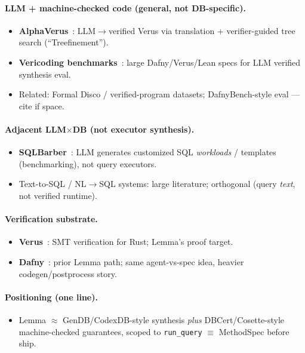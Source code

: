 \documentclass[sigconf, nonacm]{acmart}
\begin{document}
\paragraph{LLM + machine-checked code (general, not DB-specific).}
\begin{itemize}
  \item \textbf{AlphaVerus}~\cite{Aggarwal2025AlphaVerus}: LLM$\to$verified Verus via translation + verifier-guided tree search (``Treefinement'').
  \item \textbf{Vericoding benchmarks}~\cite{Dougherty2025Vericoding}: large Dafny/Verus/Lean specs for LLM verified synthesis eval.
  \item Related: Formal Disco / verified-program datasets; DafnyBench-style eval --- cite if space.
\end{itemize}

\paragraph{Adjacent LLM$\times$DB (not executor synthesis).}
\begin{itemize}
  \item \textbf{SQLBarber}~\cite{Lao2025SQLBarber}: LLM generates customized SQL \emph{workloads} / templates (benchmarking), not query executors.
  \item Text-to-SQL / NL$\to$SQL systems: large literature; orthogonal (query \emph{text}, not verified runtime).
\end{itemize}

\paragraph{Verification substrate.}
\begin{itemize}
  \item \textbf{Verus}~\cite{Lattuada2023Verus}: SMT verification for Rust; Lemma's proof target.
  \item \textbf{Dafny}~\cite{Leino2010Dafny}: prior Lemma path; same agent-vs-spec idea, heavier codegen/postprocess story.
\end{itemize}

\paragraph{Positioning (one line).}
\begin{itemize}
  \item Lemma $\approx$ GenDB/CodexDB-style synthesis \emph{plus} DBCert/Cosette-style machine-checked guarantees, scoped to \texttt{run\_query} $\equiv$ MethodSpec before ship.
\end{itemize}
\end{document}
